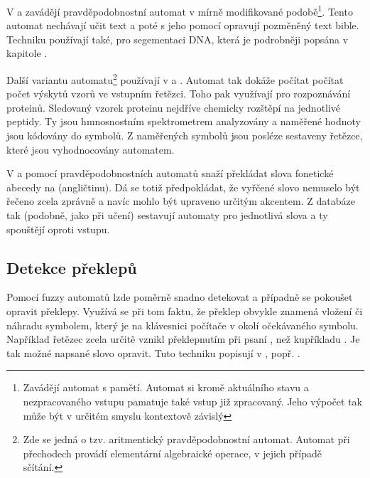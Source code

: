 \documentclass[a4paper,10pt]{article}
\begin{document}
V \cite{YorSinTis-PowAmnLeaPrAuVarMemLen} a \cite{Ron-AutLeaApp} zavádějí pravděpodobnostní automat v mírně modifikované podobě\footnote{Zavádějí automat s pamětí. Automat si kromě aktuálního stavu a nezpracovaného vstupu pamatuje také vstup již zpracovaný. Jeho výpočet tak může být v určitém smyslu kontextově závislý}. Tento automat nechávají učit text a poté s jeho pomocí opravují pozměněný text bible. Techniku používají také, pro segementaci DNA, která je podrobněji popsána v kapitole .

Další variantu automatu\footnote{Zde se jedná o tzv. aritmentický pravděpodobnostní automat. Automat při přechodech provádí elementární algebraické operace, v jejich případě sčítání.} používají v \cite{Mar+-ProAriAutApp} a \cite{Her-ProAriAutAppSoComFraBioSeqAna}. Automat tak dokáže počítat počítat počet výskytů vzorů ve vstupním řetězci. Toho pak využívají pro rozpoznávání proteinů. Sledovaný vzorek proteinu nejdříve chemicky rozštěpí na jednotlivé peptidy. Ty jsou hmnosnostním spektrometrem analyzovány a naměřené hodnoty jsou kódovány do symbolů. Z naměřených symbolů jsou posléze sestaveny řetězce, které jsou vyhodnocovány automatem.

V \cite{MohPerRoe-WeiFinStaTraSpeRec} a \cite{BahJel-DecChaWinDelSubApSpeRec} pomocí pravděpodobnostních automatů snaží překládat slova fonetické abecedy na  (angličtinu). Dá se totiž předpokládat, že vyřčené slovo nemuselo být řečeno zcela zprávně a navíc mohlo být upraveno určitým akcentem. Z databáze tak (podobně, jako při učení) sestavují automaty pro jednotlivá slova a ty spouštějí oproti vstupu.

\subsection{Detekce překlepů}
Pomocí fuzzy automatů lzde poměrně snadno detekovat a případně se pokoušet opravit překlepy. Využívá se při tom faktu, že překlep obvykle znamená vložení či náhradu symbolem, který je na klávesnici počítače v okolí očekávaného symbolu. Například řetězec  zcela určitě vznikl překlepnutím při psaní , než kupříkladu . Je tak možné napsané slovo opravit. Tuto techniku popisují v \cite{AndAbdAsm-ApprPattMatcFuzzLog}, popř. \cite{SnaKepAbrHas-AproxStriMatchFuzzAut}.%

\end{document}
